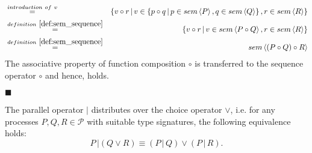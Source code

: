 \begin{myproof}
\begin{eqnarray*}
  & \overset{introduction \ of \ v}{=} & \left\{ v \circ r \,|\, v \in \left\{ p \circ q \,|\, p \in sem \left\langle P \right\rangle, q \in sem \left\langle Q \right\rangle \right\}, r \in sem \left\langle R \right\rangle \right\} \\
  & \overset{\defref{def:sem_sequence}}{=} & \left\{ v \circ r \,|\, v \in sem \left\langle P \circ Q \right\rangle, r \in sem \left\langle R \right\rangle \right\} \\
  & \overset{\defref{def:sem_sequence}}{=} & sem \left\langle \left( P \circ Q \right) \circ R \right\rangle
\end{eqnarray*}
The associative property of function composition $\circ$ is transferred to the sequence operator $\circ$ and hence,  holds.

\hfill$\blacksquare$
\end{myproof}

\begin{theorem}
\label{thm:distributivity_parallel_choice}
The parallel operator $|$ distributes over the choice operator $\vee$, i.e. for any processes $P, Q, R \in \mathcal{P}$ with suitable type signatures, the following equivalence holds:
\begin{equation*}
  P \,| \left( Q \vee R \right) \equiv \left( P \,|\, Q \right) \vee \left( P \,|\, R \right).
\end{equation*}
\end{theorem}

